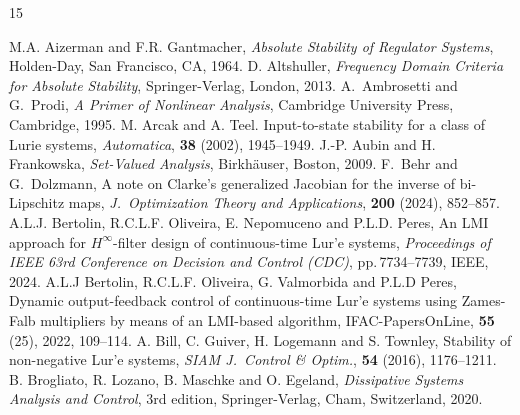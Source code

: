 \documentclass[a4paper,11pt]{article}
\numberwithin{equation}{section}
\numberwithin{figure}{section}
\numberwithin{table}{section}
\begin{document}
\begin{thebibliography}{15}
\begin{small}
\vspace{-3mm}
M.A. Aizerman and F.R. Gantmacher, {\it Absolute Stability of Regulator Systems}, Holden-Day, San Francisco, CA, 1964.
%
\vspace{-2mm}
D. Altshuller, {\it Frequency Domain Criteria for Absolute Stability}, Springer-Verlag, London, 2013.
\vspace{-2mm}
A.\ Ambrosetti and G.\ Prodi, {\it A Primer of Nonlinear Analysis}, Cambridge University Press,
Cambridge, 1995.
%
\vspace{-2mm}
M. Arcak and A. Teel. Input-to-state stability for a class of Lurie systems,
{\it Automatica}, {\bf 38} (2002), 1945--1949.
%
\vspace{-2mm}
 J.-P. Aubin and H. Frankowska, {\it Set-Valued Analysis}, Birkh{\"a}user,
Boston, 2009.
%
%
\vspace{-2mm}
F.\ Behr and G.\ Dolzmann, A note on Clarke's generalized Jacobian for the inverse of
bi-Lipschitz maps, {\it J.\ Optimization Theory and Applications}, {\bfseries 200} (2024), 852--857.
%
\vspace{-2mm}
A.L.J. Bertolin, R.C.L.F. Oliveira, E. Nepomuceno and P.L.D. Peres, An LMI approach for
$H^\infty$-filter design of continuous-time Lur'e systems, {\it Proceedings of IEEE 63rd Conference on Decision and Control (CDC)}, pp.\,7734--7739, IEEE, 2024.
%
\vspace{-2mm}
A.L.J Bertolin, R.C.L.F. Oliveira, G. Valmorbida and P.L.D Peres, Dynamic output-feedback control of continuous-time Lur'e systems using Zames-Falb multipliers by means of an LMI-based algorithm, IFAC-PapersOnLine, {\bf 55} (25), 2022, 109--114.
%
\vspace{-2mm}
A. Bill, C. Guiver, H. Logemann and S. Townley, Stability of non-negative Lur'e systems,
{\it SIAM J.\ Control \& Optim.}, {\bf 54} (2016), 1176--1211.
%
\vspace{-2mm}
B. Brogliato, R. Lozano, B. Maschke and O. Egeland, {\it Dissipative Systems Analysis
and Control}, 3rd edition, Springer-Verlag, Cham, Switzerland, 2020.

\end{small}
\end{thebibliography}
\end{document}
